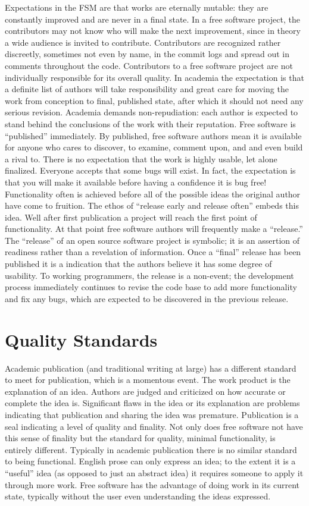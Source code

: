 \documentclass[
	fontsize=10pt, %
	twoside=false, %
	secnumdepth=1, %
]{kaobook}
\begin{document}
Expectations in the FSM are that works are eternally mutable: they are constantly improved and are never in a final state. In a free software project, the contributors may not know who will make the next improvement, since in theory a wide audience is invited to contribute. Contributors are recognized rather discreetly, sometimes not even by name, in the commit logs and spread out in comments throughout the code. Contributors to a free software project are not individually responsible for its overall quality.
In academia the expectation is that a definite list of authors will take responsibility and great care for moving the work from conception to final, published state, after which it should not need any serious revision. Academia demands non-repudiation: each author is expected to stand behind the conclusions of the work with their reputation.
Free software is “published” immediately. By published, free software authors mean it is available for anyone who cares to discover, to examine, comment upon, and and even build a rival to. There is no expectation that the work is highly usable, let alone finalized. Everyone accepts that some bugs will exist. In fact, the expectation is that you will make it available before having a confidence it is bug free! Functionality often is achieved before all of the possible ideas the original author have come to fruition. The ethos of “release early and release often” embeds this idea. Well after first publication a project will reach the first point of functionality. At that point free software authors will frequently make a “release.” The “release” of an open source software project is symbolic; it is an assertion of readiness rather than a revelation of information. Once a “final” release has been published it is a indication that the authors believe it has some degree of usability. To working programmers, the release is a non-event; the development process immediately continues to revise the code base to add more functionality and fix any bugs, which are expected to be discovered in the previous release.
\section{Quality Standards}

Academic publication (and traditional writing at large) has a
different standard to meet for publication, which is a momentous
event. The work product is the explanation of an idea. Authors are
judged and criticized on how accurate or complete the idea
is. Significant flaws in the idea or its explanation are problems
indicating that publication and sharing the idea was
premature. Publication is a seal indicating a level of quality and
finality. Not only does free software not have this sense of finality
but the standard for quality, minimal functionality, is entirely
different. Typically in academic publication there is no similar
standard to being functional. English prose can only express an idea;
to the extent it is a “useful” idea (as opposed to just an abstract
idea) it requires someone to apply it through more work. Free software
has the advantage of doing work in its current state, typically
without the user even understanding the ideas expressed.
\end{document}
